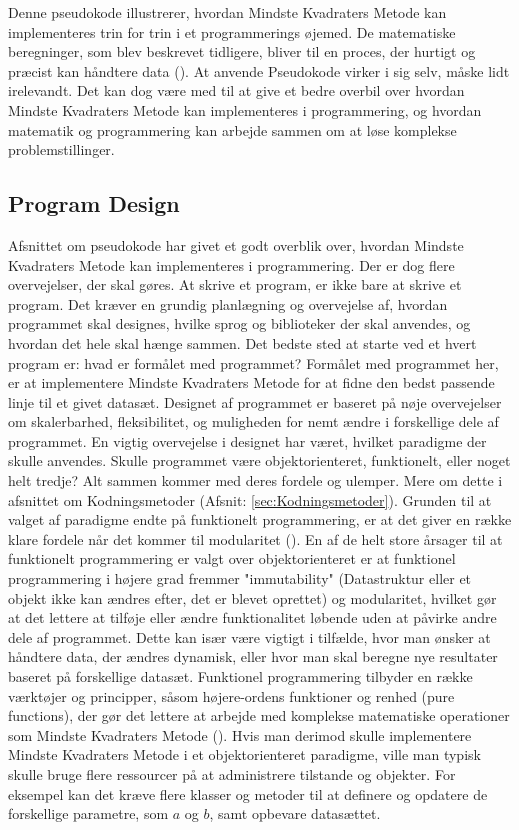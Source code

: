 Denne pseudokode illustrerer, hvordan Mindste Kvadraters Metode kan implementeres trin for trin i et programmerings øjemed. De matematiske beregninger, som blev beskrevet tidligere, bliver til en proces, der hurtigt og præcist kan håndtere data (\cite{codesansar}). At anvende Pseudokode virker i sig selv, måske lidt irelevandt. Det kan dog være med til at give et bedre overbil over hvordan Mindste Kvadraters Metode kan implementeres i programmering, og hvordan matematik og programmering kan arbejde sammen om at løse komplekse problemstillinger.

\subsection{Program Design}
Afsnittet om pseudokode har givet et godt overblik over, hvordan Mindste Kvadraters Metode kan implementeres i programmering. Der er dog flere overvejelser, der skal gøres. At skrive et program, er ikke bare at skrive et program. Det kræver en grundig planlægning og overvejelse af, hvordan programmet skal designes, hvilke sprog og biblioteker der skal anvendes, og hvordan det hele skal hænge sammen. Det bedste sted at starte ved et hvert program er: hvad er formålet med programmet? Formålet med programmet her, er at implementere Mindste Kvadraters Metode for at fidne den bedst passende linje til et givet datasæt. Designet af programmet er baseret på nøje overvejelser om skalerbarhed, fleksibilitet, og muligheden for nemt ændre i forskellige dele af programmet. En vigtig overvejelse i designet har været, hvilket paradigme der skulle anvendes. Skulle programmet være objektorienteret, funktionelt, eller noget helt tredje? Alt sammen kommer med deres fordele og ulemper. Mere om dette i afsnittet om Kodningsmetoder (Afsnit: \ref{sec:Kodningsmetoder}). Grunden til at valget af paradigme endte på funktionelt programmering, er at det giver en række klare fordele når det kommer til modularitet (\cite{gupta}). En af de helt store årsager til at funktionelt programmering er valgt over objektorienteret er at funktionel programmering i højere grad fremmer "immutability" (Datastruktur eller et objekt ikke kan ændres efter, det er blevet oprettet) og modularitet, hvilket gør at det lettere at tilføje eller ændre funktionalitet løbende uden at påvirke andre dele af programmet. Dette kan især være vigtigt i tilfælde, hvor man ønsker at håndtere data, der ændres dynamisk, eller hvor man skal beregne nye resultater baseret på forskellige datasæt. Funktionel programmering tilbyder en række værktøjer og principper, såsom højere-ordens funktioner og renhed (pure functions), der gør det lettere at arbejde med komplekse matematiske operationer som Mindste Kvadraters Metode (\cite{funktionelProgrammering}). Hvis man derimod skulle implementere Mindste Kvadraters Metode i et objektorienteret paradigme, ville man typisk skulle bruge flere ressourcer på at administrere tilstande og objekter. For eksempel kan det kræve flere klasser og metoder til at definere og opdatere de forskellige parametre, som  $a$ og $b$, samt opbevare datasættet. \\  
